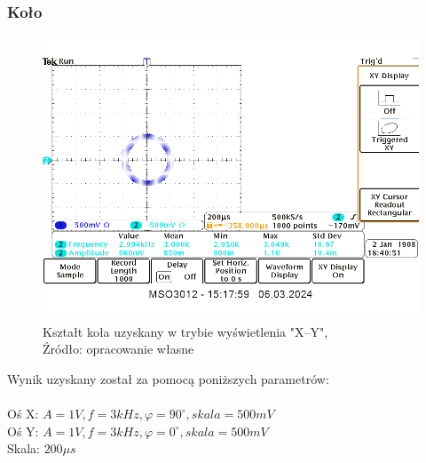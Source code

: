 \documentclass{article}
\begin{document}
        \subsubsection{Koło}
        \begin{figure}[!ht]
          \begin{center}
              \includegraphics[scale=0.25]{grafiki/kolo.png}
              \caption{Kształt koła uzyskany w trybie wyświetlenia "X--Y",\\Źródło: opracowanie własne}
          \end{center}
        \end{figure}
        Wynik uzyskany został za pomocą poniższych parametrów: \\ \\
        Oś X: $A = 1V,f = 3kHz, \varphi = 90^\circ, skala = 500mV$ \\
        Oś Y: $A = 1V,f = 3kHz, \varphi = 0^\circ, skala = 500mV$ \\
        Skala: $200 \mu s$

        \pagebreak
\end{document}
